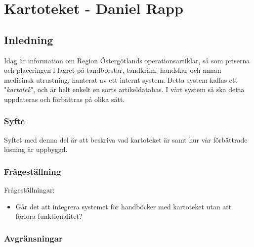 \section{Kartoteket - Daniel Rapp}
\subsection{Inledning}
Idag är information om Region Östergötlands operationsartiklar, så som priserna och
placeringen i lagret på tandborstar, tandkräm, handskar och annan
medicinsk utrustning, hanterat av ett internt system.
Detta system kallas ett "\textit{kartotek}", och är helt enkelt en sorts artikeldatabas.
I vårt system så ska detta uppdateras och förbättras på olika sätt.

\subsubsection{Syfte}
Syftet med denna del är att beskriva vad kartoteket är samt
hur vår förbättrade lösning är uppbyggd.


\subsubsection{Frågeställning}
Frågeställningar:
\begin{itemize}
  \item Går det att integrera systemet för handböcker med kartoteket utan att förlora funktionalitet?
\end{itemize}


\subsubsection{Avgränsningar}



